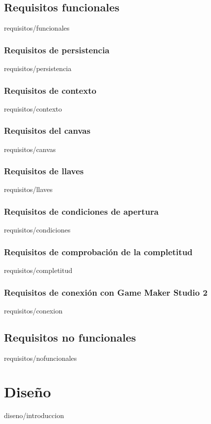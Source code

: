 \documentclass[epsbased,copyright,final,printable,covers,extendedindex,firstnumbered,tfg,gnuplot]{tfgtfmthesisuam}
\begin{document}
	\section{Requisitos funcionales\label{SEC:REQUISITOSFUNCIONALES}}{requisitos/funcionales}
		\begin{functional}
		\subsection{Requisitos de persistencia\label{SUBSEC:REQPERSISTENCIA}}{requisitos/persistencia}
		\subsection{Requisitos de contexto\label{SUBSEC:REQCONTEXTO}}{requisitos/contexto}
		\subsection{Requisitos del canvas\label{SUBSEC:REQCANVAS}}{requisitos/canvas}
		\subsection{Requisitos de llaves\label{SUBSEC:REQLLAVES}}{requisitos/llaves}
		\subsection{Requisitos de condiciones de apertura\label{SUBSEC:REQCONDICIONES}}{requisitos/condiciones}
		\subsection{Requisitos de comprobación de la completitud\label{SUBSEC:REQCOMPLETITUD}}{requisitos/completitud}
		\subsection{Requisitos de conexión con Game Maker Studio 2\label{SUBSEC:REQCONEXION}}{requisitos/conexion}
		\end{functional}
	\section{Requisitos no funcionales\label{SEC:REQUISITOSNOFUNCIONALES}}{requisitos/nofuncionales}
	
\chapter{Diseño\label{CAP:DISENO}}{diseno/introduccion}
\end{document}
